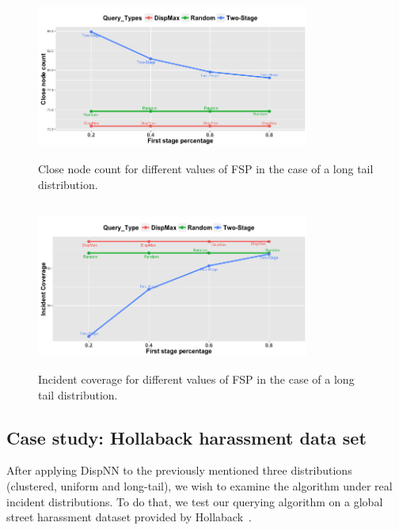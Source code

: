 \documentclass{acm_proc_article-sp}
\begin{document}
\begin{figure}[!h]
\centering
\includegraphics[width=9cm ,height=5.5cm]{figuresPng/LT-closePeople.png}
\caption{Close node count for different values of FSP in the case of a long tail distribution. }
\label{fig:LTClosePeople}
\end{figure}
\begin{figure}[!h]
\centering
\includegraphics[width=9cm ,height=5.5cm]{figuresPng/LT-incidCov.png}
\caption{Incident coverage for different values of FSP in the case of a long tail distribution. }
\label{fig:LTIncdCove}
\end{figure}



\subsection{Case study: Hollaback harassment data set}
After applying DispNN to the previously mentioned three distributions (clustered, uniform and long-tail), we wish to examine the algorithm under real incident distributions. To do that, we test our querying algorithm on a global street harassment dataset provided by Hollaback~\cite{hollaback}.
\end{document}

